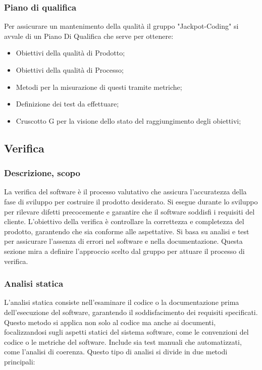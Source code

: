 \documentclass{article}
\begin{document}
    \subsubsection{Piano di qualifica}
    Per assicurare un mantenimento della qualità il gruppo "Jackpot-Coding" si avvale di un Piano Di Qualifica che serve per ottenere:
    \begin{itemize}
		\item Obiettivi della qualità di Prodotto;
		\item Obiettivi della qualità di Processo;
		\item Metodi per la misurazione di questi tramite metriche;
		\item Definizione dei test da effettuare;
		\item Cruscotto G per la visione dello stato del raggiungimento degli obiettivi;
    \end{itemize}

\subsection{Verifica}
    \subsubsection{Descrizione, scopo}
    La verifica del software è il processo valutativo che assicura l'accuratezza della fase di sviluppo per costruire il prodotto desiderato. Si esegue durante lo sviluppo per rilevare difetti precocemente e garantire che il software soddisfi i requisiti del cliente. L'obiettivo della verifica è controllare la correttezza e completezza del prodotto, garantendo che sia conforme alle aspettative. Si basa su analisi e test per assicurare l'assenza di errori nel software e nella documentazione. Questa sezione mira a definire l'approccio scelto dal gruppo per attuare il processo di verifica.
    \subsubsection{Analisi statica}
    L'analisi statica consiste nell'esaminare il codice o la documentazione prima dell'esecuzione del software, garantendo il soddisfacimento dei requisiti specificati. Questo metodo si applica non solo al codice ma anche ai documenti, focalizzandosi sugli aspetti statici del sistema software, come le convenzioni del codice o le metriche del software. Include sia test manuali che automatizzati, come l'analisi di coerenza.
    Questo tipo di analisi si divide in due metodi principali: 
\end{document}
